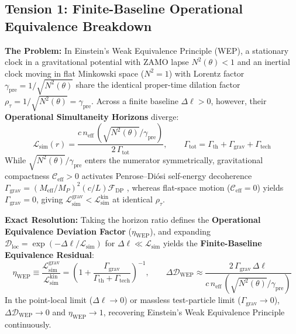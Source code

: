 \documentclass[11pt,a4paper]{article}
\begin{document}
\subsection{Tension 1: Finite-Baseline Operational Equivalence Breakdown}
\textbf{The Problem:} In Einstein's Weak Equivalence Principle (WEP), a stationary clock in a gravitational potential with ZAMO lapse $N^2(\theta) < 1$ and an inertial clock moving in flat Minkowski space ($N^2 = 1$) with Lorentz factor $\gamma_{\mathrm{pre}} = 1/\sqrt{N^2(\theta)}$ share the identical proper-time dilation factor $\rho_\tau = 1/\sqrt{N^2(\theta)} = \gamma_{\mathrm{pre}}$. Across a finite baseline $\Delta\ell > 0$, however, their \textbf{Operational Simultaneity Horizons} diverge:
\begin{equation}
    \mathcal{L}_{\mathrm{sim}}(r) = \frac{c \, n_{\mathrm{eff}} \, \left(\sqrt{N^2(\theta)} / \gamma_{\mathrm{pre}}\right)}{2 \, \Gamma_{\mathrm{tot}}}, \qquad \Gamma_{\mathrm{tot}} = \Gamma_{\mathrm{th}} + \Gamma_{\mathrm{grav}} + \Gamma_{\mathrm{tech}}
\end{equation}
While $\sqrt{N^2(\theta)} / \gamma_{\mathrm{pre}}$ enters the numerator symmetrically, gravitational compactness $\mathcal{C}_{\mathrm{eff}} > 0$ activates Penrose--Di\'osi self-energy decoherence $\Gamma_{\mathrm{grav}} = (M_{\mathrm{eff}}/M_P)^2 (c/L)\mathcal{F}_{\mathrm{DP}}$ \cite{diosi1989,penrose1996}, whereas flat-space motion ($\mathcal{C}_{\mathrm{eff}} = 0$) yields $\Gamma_{\mathrm{grav}} = 0$, giving $\mathcal{L}_{\mathrm{sim}}^{\mathrm{grav}} < \mathcal{L}_{\mathrm{sim}}^{\mathrm{kin}}$ at identical $\rho_\tau$.

\textbf{Exact Resolution:} Taking the horizon ratio defines the \textbf{Operational Equivalence Deviation Factor} ($\eta_{\mathrm{WEP}}$), and expanding $\mathcal{D}_{\mathrm{loc}} = \exp(-\Delta\ell / \mathcal{L}_{\mathrm{sim}})$ for $\Delta\ell \ll \mathcal{L}_{\mathrm{sim}}$ yields the \textbf{Finite-Baseline Equivalence Residual}:
\begin{equation}
    \eta_{\mathrm{WEP}} \equiv \frac{\mathcal{L}_{\mathrm{sim}}^{\mathrm{grav}}}{\mathcal{L}_{\mathrm{sim}}^{\mathrm{kin}}} = \left(1 + \frac{\Gamma_{\mathrm{grav}}}{\Gamma_{\mathrm{th}} + \Gamma_{\mathrm{tech}}}\right)^{-1}, \qquad \Delta\mathcal{D}_{\mathrm{WEP}} \approx \frac{2 \, \Gamma_{\mathrm{grav}} \, \Delta\ell}{c \, n_{\mathrm{eff}} \, \left(\sqrt{N^2(\theta)} / \gamma_{\mathrm{pre}}\right)}
\end{equation}
In the point-local limit ($\Delta\ell \to 0$) or massless test-particle limit ($\Gamma_{\mathrm{grav}} \to 0$), $\Delta\mathcal{D}_{\mathrm{WEP}} \to 0$ and $\eta_{\mathrm{WEP}} \to 1$, recovering Einstein's Weak Equivalence Principle continuously.
\end{document}
